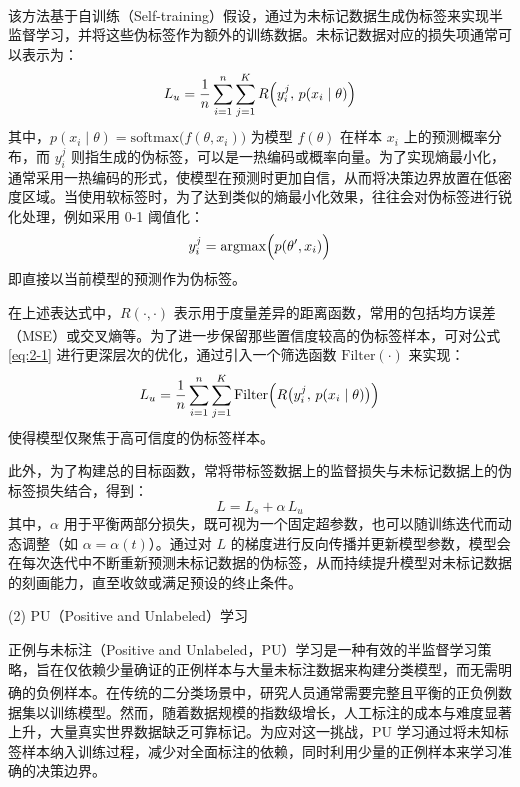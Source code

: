 该方法基于自训练（Self-training）假设\textsuperscript{\cite{lee2013pseudo}}，通过为未标记数据生成伪标签来实现半监督学习，并将这些伪标签作为额外的训练数据。未标记数据对应的损失项通常可以表示为：
\begin{equation}\label{eq:2-1}
	L_u = \frac{1}{n} \sum_{i=1}^{n} \sum_{j=1}^{K} R \Bigl( y_i^{j}, \, p(x_i \mid \theta) \Bigr)
\end{equation}
其中，$ p(x_i \mid \theta) = \mathrm{softmax}\bigl(f(\theta, x_i)\bigr) $ 为模型 $ f(\theta) $ 在样本 $ x_i $ 上的预测概率分布，而 $ y_i^{j} $ 则指生成的伪标签，可以是一热编码或概率向量。为了实现熵最小化，通常采用一热编码的形式，使模型在预测时更加自信，从而将决策边界放置在低密度区域。当使用软标签时，为了达到类似的熵最小化效果，往往会对伪标签进行锐化处理，例如采用 0-1 阈值化：
\begin{equation}\label{eq:2-2}
	y_i^{j} = \mathrm{argmax}\Bigl(p(\theta', x_i)\Bigr)
\end{equation}
即直接以当前模型的预测作为伪标签。

在上述表达式中，$ R(\cdot, \cdot) $ 表示用于度量差异的距离函数，常用的包括均方误差（MSE）或交叉熵等\textsuperscript{\cite{van2020survey}}。为了进一步保留那些置信度较高的伪标签样本，可对公式 \eqref{eq:2-1} 进行更深层次的优化，通过引入一个筛选函数 $\mathrm{Filter}(\cdot)$ 来实现：
\begin{equation}\label{eq:2-3}
	L_u = \frac{1}{n} \sum_{i=1}^{n} \sum_{j=1}^{K} 
	\mathrm{Filter} \Bigl( R \bigl( y_i^{j},\, p(x_i \mid \theta) \bigr) \Bigr)
\end{equation}
使得模型仅聚焦于高可信度的伪标签样本。

此外，为了构建总的目标函数，常将带标签数据上的监督损失与未标记数据上的伪标签损失结合，得到：
\begin{equation}\label{eq:2-4}
	L = L_s + \alpha \, L_u
\end{equation}
其中，$ \alpha $ 用于平衡两部分损失，既可视为一个固定超参数，也可以随训练迭代而动态调整（如 $\alpha = \alpha(t)$）。通过对 $ L $ 的梯度进行反向传播并更新模型参数，模型会在每次迭代中不断重新预测未标记数据的伪标签，从而持续提升模型对未标记数据的刻画能力，直至收敛或满足预设的终止条件。


(2) PU（Positive and Unlabeled）学习

正例与未标注（Positive and Unlabeled，PU）学习是一种有效的半监督学习策略，旨在仅依赖少量确证的正例样本与大量未标注数据来构建分类模型，而无需明确的负例样本\textsuperscript{\cite{elkan2008learning,mordelet2013bagging}}。在传统的二分类场景中，研究人员通常需要完整且平衡的正负例数据集以训练模型。然而，随着数据规模的指数级增长，人工标注的成本与难度显著上升，大量真实世界数据缺乏可靠标记。为应对这一挑战，PU 学习通过将未知标签样本纳入训练过程，减少对全面标注的依赖，同时利用少量的正例样本来学习准确的决策边界。

